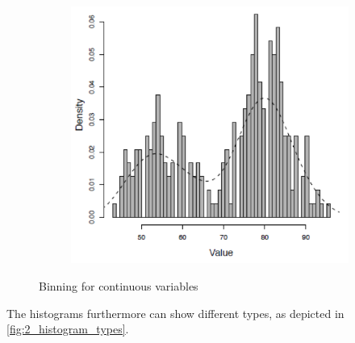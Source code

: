\begin{figure}[H]
\begin{subfigure}{0.32\textwidth}
  \end{subfigure}
  \begin{subfigure}{0.32\textwidth}
    \includegraphics[width=\textwidth]{assets/visualization_and_extraction/single_feature_example/bin_overfitting.png}
  \end{subfigure}
  \caption{Binning for continuous variables}
  \label{fig:2_binning}
\end{figure}

The histograms furthermore can show different types, as depicted in \ref{fig:2_histogram_types}.

